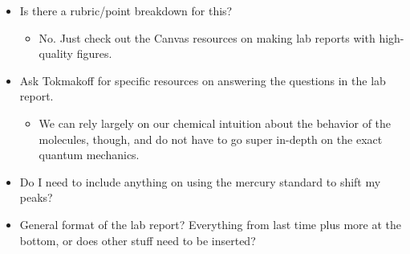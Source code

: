 \documentclass[../notes.tex]{subfiles}
\begin{document}
\begin{itemize}
\begin{itemize}
    \end{itemize}
    \item Is there a rubric/point breakdown for this?
    \begin{itemize}
        \item No. Just check out the Canvas resources on making lab reports with high-quality figures.
    \end{itemize}
    \item Ask Tokmakoff for specific resources on answering the questions in the lab report.
    \begin{itemize}
        \item We can rely largely on our chemical intuition about the behavior of the molecules, though, and do not have to go super in-depth on the exact quantum mechanics.
    \end{itemize}
    \item Do I need to include anything on using the mercury standard to shift my peaks?
    \item General format of the lab report? Everything from last time plus more at the bottom, or does other stuff need to be inserted?
\end{itemize}
\end{document}

